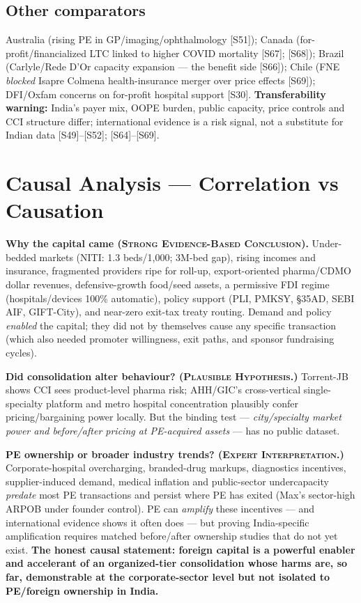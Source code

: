 \documentclass[11pt,a4paper]{article}
\newcommand{\SE}{\textcolor{secol}{\textsc{\textbf{Strong Evidence-Based Conclusion}}}}
\newcommand{\EI}{\textcolor{eicol}{\textsc{\textbf{Expert Interpretation}}}}
\newcommand{\PH}{\textcolor{phcol}{\textsc{\textbf{Plausible Hypothesis}}}}
\newcommand{\cs}[1]{\textnormal{[#1]}}
\begin{document}
\subsection{Other comparators}

Australia (rising PE in GP/imaging/ophthalmology \cs{S51}); Canada (for-profit/financialized LTC linked to higher COVID mortality \cs{S67}; \cs{S68}); Brazil (Carlyle/Rede D'Or capacity expansion --- the benefit side \cs{S66}); Chile (FNE \emph{blocked} Isapre Colmena health-insurance merger over price effects \cs{S69}); DFI/Oxfam concerns on for-profit hospital support \cs{S30}. \textbf{Transferability warning:} India's payer mix, OOPE burden, public capacity, price controls and CCI structure differ; international evidence is a risk signal, not a substitute for Indian data \cs{S49}--\cs{S52}; \cs{S64}--\cs{S69}.

\section{Causal Analysis --- Correlation vs Causation}\label{sec:causal}
\textbf{Why the capital came (\SE).} Under-bedded markets (NITI: 1.3 beds/1{,}000; 3M-bed gap), rising incomes and insurance, fragmented providers ripe for roll-up, export-oriented pharma/CDMO dollar revenues, defensive-growth food/seed assets, a permissive FDI regime (hospitals/devices 100\% automatic), policy support (PLI, PMKSY, \S35AD, SEBI AIF, GIFT-City), and near-zero exit-tax treaty routing. Demand and policy \emph{enabled} the capital; they did not by themselves cause any specific transaction (which also needed promoter willingness, exit paths, and sponsor fundraising cycles).

\textbf{Did consolidation alter behaviour? (\PH.)} Torrent-JB shows CCI sees product-level pharma risk; AHH/GIC's cross-vertical single-specialty platform and metro hospital concentration plausibly confer pricing/bargaining power locally. But the binding test --- \emph{city/specialty market power and before/after pricing at PE-acquired assets} --- has no public dataset.

\textbf{PE ownership or broader industry trends? (\EI.)} Corporate-hospital overcharging, branded-drug markups, diagnostics incentives, supplier-induced demand, medical inflation and public-sector undercapacity \emph{predate} most PE transactions and persist where PE has exited (Max's sector-high ARPOB under founder control). PE can \emph{amplify} these incentives --- and international evidence shows it often does --- but proving India-specific amplification requires matched before/after ownership studies that do not yet exist. \textbf{The honest causal statement: foreign capital is a powerful enabler and accelerant of an organized-tier consolidation whose harms are, so far, demonstrable at the corporate-sector level but not isolated to PE/foreign ownership in India.}
\end{document}
